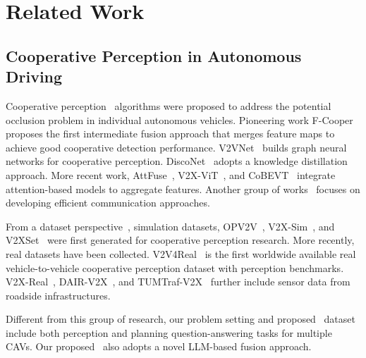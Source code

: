 \section{Related Work}

\subsection{Cooperative Perception in Autonomous Driving}
Cooperative perception~\cite{huang2024v2xcooperativeperceptionautonomous} algorithms were proposed to address the potential occlusion problem in individual autonomous vehicles. Pioneering work F-Cooper~\cite{chen2019fcooper} proposes the first intermediate fusion approach that merges feature maps to achieve good cooperative detection performance. V2VNet~\cite{wang2020v2vnet} builds graph neural networks for cooperative perception. DiscoNet~\cite{li2021disco} adopts a knowledge distillation approach. More recent work, AttFuse~\cite{xu2022opencood}, V2X-ViT~\cite{xu2022v2xvit}, and CoBEVT~\cite{xu2022cobevt} integrate attention-based models to aggregate features. Another group of works~\cite{liu2020when2com, hu2022where2comm, yang2023how2comm, chiu2023selective} focuses on developing efficient communication approaches. 

From a dataset perspective~\cite{liu2024asurveyon, yazgan2024collaborativeperceptiondatasetsautonomous}, simulation datasets, OPV2V~\cite{xu2022opencood}, V2X-Sim~\cite{li2022v2xsim}, and V2XSet~\cite{xu2022v2xvit} were first generated for cooperative perception research. More recently, real datasets have been collected. V2V4Real~\cite{xu2023v2v4real} is the first worldwide available real vehicle-to-vehicle cooperative perception dataset with perception benchmarks. V2X-Real~\cite{xiang2024v2xreal}, DAIR-V2X~\cite{yu2022dair-v2x}, and TUMTraf-V2X~\cite{zimmer2024tumtraf} further include sensor data from roadside infrastructures.

Different from this group of research, our problem setting and proposed \namedataset~dataset include both perception and planning question-answering tasks for multiple CAVs. Our proposed \namemethod~also adopts a novel LLM-based fusion approach.


